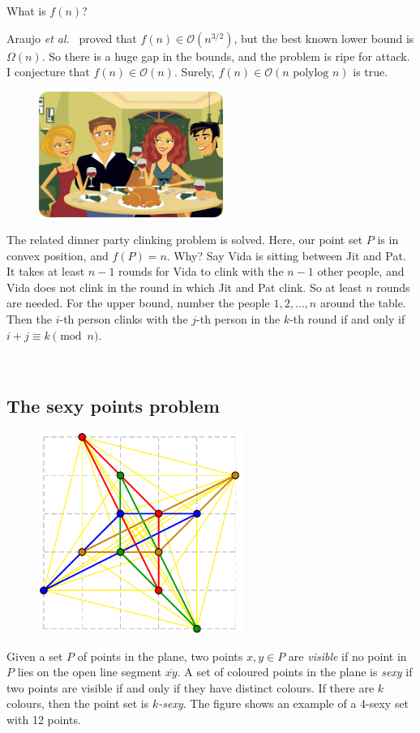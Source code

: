 \documentclass{patmorin}
\newcommand{\poser}[1]{\noindent{\textit{#1}}}
\begin{document}
\begin{op}
  What is $f(n)$? 
\end{op}

Araujo \emph{et al.}~\cite{Araujo} proved that
$f(n)\in\mathcal{O}(n^{3/2})$, but the best known lower bound is
$\Omega(n)$. So there is a huge gap in the bounds, and the problem is
ripe for attack. I conjecture that $f(n)\in\mathcal{O}(n)$. Surely,
$f(n)\in\mathcal{O}(n\text{ polylog } n)$ is true.

\begin{figure}
\includegraphics[width=6cm]{dinner}
\end{figure}

The related dinner party clinking problem is solved. Here, our point
set $P$ is in convex position, and $f(P)=n$. Why? Say Vida is sitting
between Jit and Pat. It takes at least $n-1$ rounds for Vida to clink
with the $n-1$ other people, and Vida does not clink in the round in
which Jit and Pat clink. So at least $n$ rounds are needed. For the upper
bound, number the people $1,2,\dots,n$ around the table. Then the $i$-th
person clinks with the $j$-th person in the $k$-th round if and only if
$i+j\equiv k\pmod{n}$.

\ %

\subsection{The sexy points problem}

\poser{David Wood}

\begin{figure}
\hfill
\includegraphics[width=67mm]{K3333}
\end{figure}
Given a set $P$ of points in the plane, two points $x,y\in P$
are \emph{visible} if no point in $P$ lies on the open line segment
$\overline{xy}$. A set of coloured points in the plane is \emph{sexy}
if two points are visible if and only if they have distinct colours. If
there are $k$ colours, then the point set is \emph{$k$-sexy}. The figure
shows an example of a 4-sexy set with 12 points.
\end{document}
